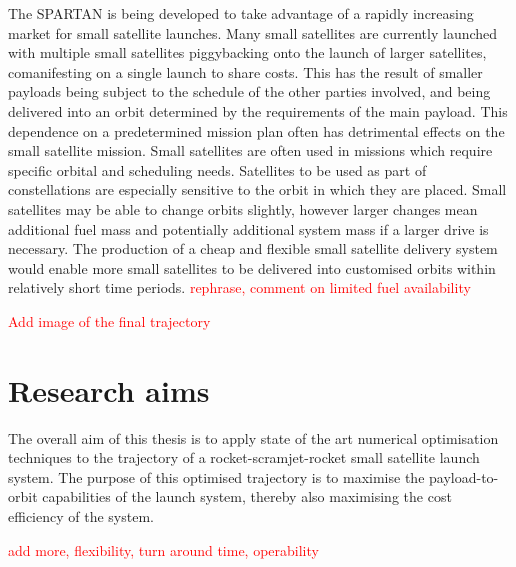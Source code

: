   The SPARTAN is being developed to take advantage of a rapidly increasing market for small satellite launches.
  Many small satellites are currently launched with multiple small satellites piggybacking onto the launch of larger satellites, comanifesting on a single launch to share costs. This has the result
  of smaller payloads being subject to the schedule of the other parties involved, and being delivered into
  an orbit determined by the requirements of the main payload. This dependence on a predetermined mission plan often has detrimental effects on the small satellite mission. Small satellites are often used in missions which require specific orbital and scheduling needs. Satellites to be used as part of constellations are especially sensitive to the orbit in which they are placed. Small satellites may be able to change orbits slightly, however larger changes mean additional fuel mass and potentially additional system mass if a larger drive is necessary. 
  The production of a cheap and flexible small satellite delivery system would enable more small satellites to be delivered into customised orbits within relatively short time periods.
  \textcolor{red}{rephrase, comment on limited fuel availability}
  

  	\textcolor{red}{Add image of the final trajectory}
  \section{Research aims}

    The overall aim of this thesis is to apply state of the art numerical optimisation techniques to the trajectory of a rocket-scramjet-rocket small satellite launch system. The purpose of this optimised trajectory is to maximise the payload-to-orbit capabilities of the launch system, thereby also maximising the cost efficiency of the system. 
    
    \textcolor{red}{add more, flexibility, turn around time, operability}
    

